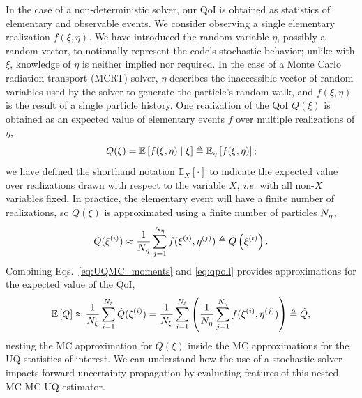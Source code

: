 In the case of a non-deterministic solver, our QoI is obtained as statistics of elementary and observable events. We consider observing a single elementary realization $f(\xi, \eta)$. We have introduced the random variable $\eta$, possibly a random vector, to notionally represent the code's stochastic behavior; unlike with $\xi$, knowledge of $\eta$ is neither implied nor required. 
In the case of a Monte Carlo radiation transport (MCRT) solver, $\eta$ describes the inaccessible vector of random variables used by the solver to generate the particle's random walk, and $f(\xi, \eta)$ is the result of a single particle history. One realization of the QoI $Q(\xi)$ is obtained as an expected value of elementary events $f$ over multiple realizations of $\eta$, \begin{equation}
\label{eq:QoI_UQ}
 Q(\xi) = \mathbb{E}\left[f(\xi,\eta) \;\middle|\; \xi\right]  \triangleq \mathbb{E}_\eta\left[ f(\xi,\eta) \right];
\end{equation}
we have defined the shorthand notation $\mathbb{E}_X\left[\cdot\right]$ to indicate the expected value over realizations drawn with respect to the variable $X$, \textit{i.e.} with all non-$X$ variables fixed. In practice, the elementary event will have a finite number of realizations, so $Q(\xi)$ is approximated using a finite number of particles ${N_\eta}$,
\begin{equation}\label{eq:qpoll}
    Q(\xi^{(i)}) \approx \frac{1}{{N_\eta}} \sum_{j=1}^{N_\eta} f(\xi^{(i)},\eta^{(j)})
          \triangleq \tilde{Q}\left(\xi^{(i)}\right).
\end{equation}
Combining Eqs.~\eqref{eq:UQMC_moments} and \eqref{eq:qpoll} provides approximations for the expected value of the QoI,
\begin{equation}\label{eq:MCMC_moments}
        \mathbb{E}\left[Q\right] \approx \frac{1}{{N_\xi}} \sum_{i=1}^{{N_\xi}} \tilde{Q}(\xi^{(i)})
        = \frac{1}{{N_\xi}} \sum_{i=1}^{{N_\xi}} \left( \frac{1}{{N_\eta}} \sum_{j=1}^{N_\eta} f(\xi^{(i)},\eta^{(j)}) \right)  \triangleq \hat{Q} ,
\end{equation}
nesting the MC approximation for $Q(\xi)$ inside the MC approximations for the UQ statistics of interest. We can understand how the use of a stochastic solver impacts forward uncertainty propagation by evaluating features of this nested MC-MC UQ estimator. 


